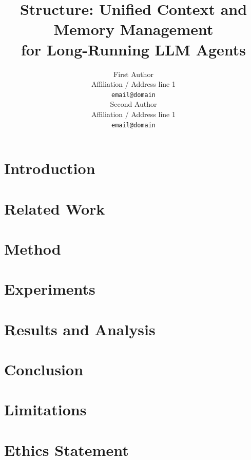\documentclass[11pt]{article}
\title{Structure: Unified Context and Memory Management\\for Long-Running LLM Agents}
\author{
  First Author \\
  Affiliation / Address line 1 \\
  \texttt{email@domain} \\
  \And
  Second Author \\
  Affiliation / Address line 1 \\
  \texttt{email@domain} \\
}
\begin{document}
\maketitle

\begin{abstract}

\end{abstract}

\section{Introduction}
\label{sec:introduction}


\section{Related Work}
\label{sec:related_work}


\section{Method}
\label{sec:method}


\section{Experiments}
\label{sec:experiments}


\section{Results and Analysis}
\label{sec:results}


\section{Conclusion}
\label{sec:conclusion}


\section*{Limitations}


\section*{Ethics Statement}

\end{document}
